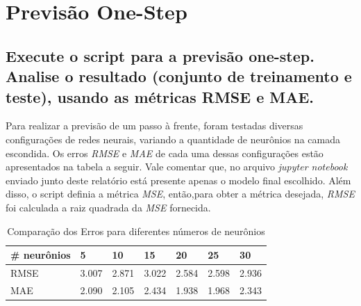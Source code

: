 \documentclass[12pt]{article}
\begin{document}
	\section{Previsão One-Step}
	
	\subsection{Execute o script para a previsão one-step. Analise o resultado (conjunto	de treinamento e teste), usando as métricas RMSE e MAE.}\label{subsec:2.1}
	
	Para realizar a previsão de um passo à frente, foram testadas diversas configurações de redes neurais, variando a quantidade de neurônios na camada escondida. Os erros \textit{RMSE} e \textit{MAE} de cada uma dessas configurações estão apresentados na tabela a seguir. Vale comentar que, no arquivo \textit{jupyter notebook} enviado junto deste relatório está presente apenas o modelo final escolhido. Além disso, o script definia a métrica \textit{MSE}, então,para obter a métrica desejada, \textit{RMSE} foi calculada a raiz quadrada da \textit{MSE} fornecida.
	
	\begin{table}[H]\label{tab:comparacaoNeuronios}
		\centering
		\begin{tabular}{|l|l|l|l|l|l|l|}
			\hline
			\# neurônios & 5     & 10    & 15    & 20    & 25    & 30    \\ \hline
			RMSE         & 3.007 & 2.871 & 3.022 & 2.584 & 2.598 & 2.936 \\ \hline
			MAE          & 2.090 & 2.105 & 2.434 & 1.938 & 1.968 & 2.343 \\ \hline
		\end{tabular}
	\caption{Comparação dos Erros para diferentes números de neurônios}
	\end{table}
\end{document}
